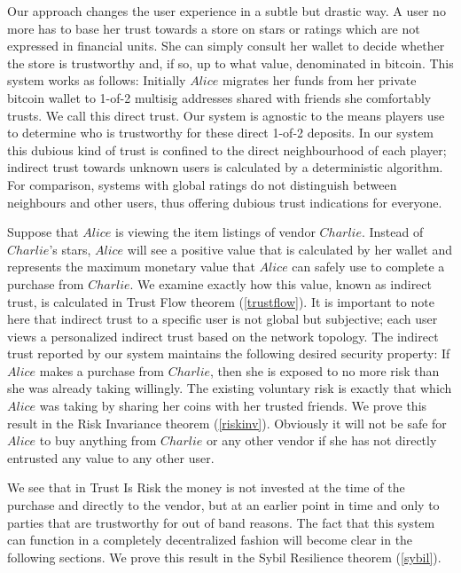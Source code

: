   Our approach changes the user experience in a subtle but drastic way. A user no more has to base her trust towards a
  store on stars or ratings which are not expressed in financial units. She can simply consult her wallet to decide whether
  the store is trustworthy and, if so, up to what value, denominated in bitcoin. This system works as follows: Initially
  $Alice$ migrates her funds from her private bitcoin wallet to 1-of-2 multisig addresses shared with friends she
  comfortably trusts. We call this direct trust. Our system is agnostic to the means players use to determine who is
  trustworthy for these direct 1-of-2 deposits. In our system this dubious kind of trust is confined to the direct
  neighbourhood of each player; indirect trust towards unknown users is calculated by a deterministic algorithm. For
  comparison, systems with global ratings do not distinguish between neighbours and other users, thus offering dubious trust
  indications for everyone.

  Suppose that $Alice$ is viewing the item listings of vendor $Charlie$. Instead of $Charlie$'s stars, $Alice$ will see a
  positive value that is calculated by her wallet and represents the maximum monetary value that $Alice$ can safely use to
  complete a purchase from $Charlie$. We examine exactly how this value, known as indirect trust, is calculated in Trust
  Flow theorem (\ref{trustflow}). It is important to note here that indirect trust to a specific user is not global but
  subjective; each user views a personalized indirect trust based on the network topology. The indirect trust reported by
  our system maintains the following desired security property: If $Alice$ makes a purchase from $Charlie$, then she is
  exposed to no more risk than she was already taking willingly. The existing voluntary risk is exactly that which $Alice$
  was taking by sharing her coins with her trusted friends. We prove this result in the Risk Invariance theorem
  (\ref{riskinv}). Obviously it will not be safe for $Alice$ to buy anything from $Charlie$ or any other vendor if she has
  not directly entrusted any value to any other user.

  We see that in Trust Is Risk the money is not invested at the time of the purchase and directly to the vendor, but at an
  earlier point in time and only to parties that are trustworthy for out of band reasons. The fact that this system can
  function in a completely decentralized fashion will become clear in the following sections. We prove this result in the
  Sybil Resilience theorem (\ref{sybil}).

